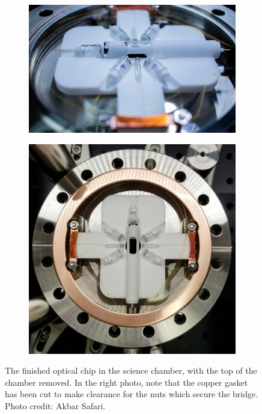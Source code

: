 \begin{figure}[h!]
    \centering
    \begin{subfigure}[b]{0.61\textwidth}
        \centering
        \includegraphics[width=\textwidth]{Images/chip_in_chamber_akbar.pdf}
    \end{subfigure}
    \begin{subfigure}[b]{0.375\textwidth}
        \centering
        \includegraphics[width=\textwidth]{Images/chip_in_chamber_with_gasket.pdf}
    \end{subfigure}
    \hfill
    \caption{The finished optical chip in the science chamber, with the top of the chamber removed. In the right photo, note that the copper gasket has been cut to make clearance for the nuts which secure the bridge. Photo credit: Akbar Safari.}
    \label{fig:chip_in_chamber_akbar}
\end{figure}

